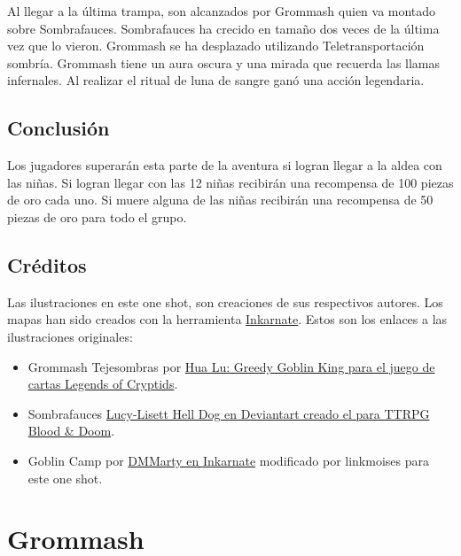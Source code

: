 \documentclass[10pt,twoside,twocolumn,openany]{dndbook}
\begin{document}
Al llegar a la última trampa, son alcanzados por Grommash quien va montado sobre Sombrafauces.
Sombrafauces ha crecido en tamaño dos veces de la última vez que lo vieron. Grommash se ha desplazado
utilizando Teletransportación sombría. Grommash tiene un aura oscura y una mirada que recuerda las llamas 
infernales. Al realizar el ritual de luna de sangre ganó una acción legendaria.

\section{Conclusión}

Los jugadores superarán esta parte de la aventura si logran llegar a la aldea con las niñas. Si logran 
llegar con las 12 niñas recibirán una recompensa de 100 piezas de oro cada uno. Si muere alguna de las 
niñas recibirán una recompensa de 50 piezas de oro para todo el grupo.

\section{Créditos}

Las ilustraciones en este one shot, son creaciones de sus respectivos autores. Los mapas han sido 
creados con la herramienta \href{https://inkarnate.com/}{Inkarnate}. Estos son los enlaces a las 
ilustraciones originales:

\begin{itemize}
  \item Grommash Tejesombras por \href{https://legendofthecryptids.fandom.com/wiki/Greedy_Goblin_King}{Hua Lu: Greedy Goblin King para el juego de cartas Legends of Cryptids}.
  \item Sombrafauces \href{https://www.deviantart.com/lucy-lisett/art/Death-Dog-901248620}{Lucy-Lisett Hell Dog en Deviantart creado el para TTRPG Blood \& Doom}.
  \item Goblin Camp por \href{https://inkarnate.com/m/zkNwn5--goblin-camp/}{DMMarty en Inkarnate} modificado por linkmoises para este one shot.
\end{itemize}

\chapter*{Grommash}
\end{document}
